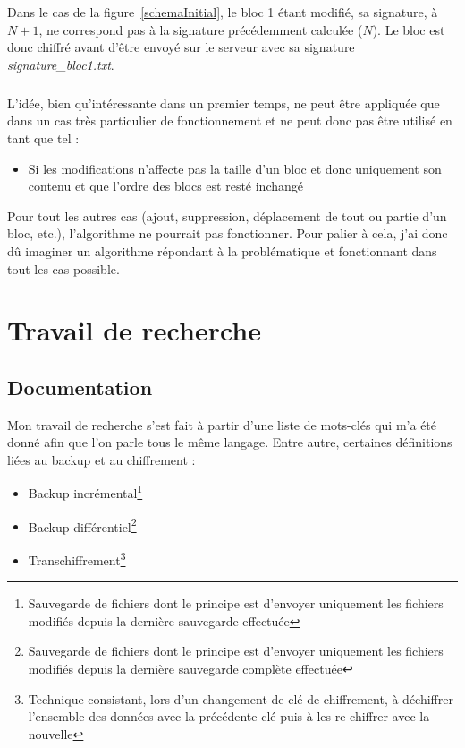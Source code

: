\documentclass[a4paper,10pt, twoside]{report}
\begin{document}
\begin{spacing}{1.2}
Dans le cas de la figure~\ref{schemaInitial}, le bloc 1 \'etant modifi\'e, sa
signature, \`a \(N + 1\), ne correspond pas \`a la signature pr\'ec\'edemment
calcul\'ee (\(N\)). Le bloc est donc chiffr\'e avant d'\^etre envoy\'e sur le
serveur avec sa signature \textit{signature\_bloc1.txt}.

\subparagraph{}
L'id\'ee, bien qu'int\'eressante dans un premier temps, ne peut \^etre
appliqu\'ee que dans un cas tr\`es particulier de fonctionnement et ne peut
donc pas \^etre utilis\'e en tant que tel :
\begin{itemize}
 \item Si les modifications n'affecte pas la taille d'un bloc et donc
 uniquement son contenu et que l'ordre des blocs est rest\'e inchang\'e
\end{itemize}

Pour tout les autres cas (ajout, suppression, d\'eplacement de tout ou partie
d'un bloc, etc.), l'algorithme ne pourrait pas fonctionner. Pour palier \`a
cela, j'ai donc d\^u imaginer un algorithme r\'epondant \`a la probl\'ematique
et fonctionnant dans tout les cas possible.

\section{Travail de recherche}
\label{secTravailRecherche}
\subsection{Documentation}
Mon travail de recherche s'est fait \`a partir d'une liste de mots-cl\'es qui
m'a \'et\'e donn\'e afin que l'on parle tous le m\^eme langage. Entre autre,
certaines d\'efinitions li\'ees au backup et au chiffrement :
\begin{itemize}
 \item Backup incr\'emental\footnote{Sauvegarde de fichiers dont le principe est
 d'envoyer uniquement les fichiers modifi\'es depuis la derni\`ere sauvegarde
 effectu\'ee}
 \item Backup diff\'erentiel\footnote{Sauvegarde de fichiers dont le principe
 est d'envoyer uniquement les fichiers modifi\'es depuis la derni\`ere
 sauvegarde compl\`ete effectu\'ee}
 \item Transchiffrement\footnote{Technique consistant, lors d'un changement
 de cl\'e de chiffrement, \`a d\'echiffrer l'ensemble des donn\'ees avec la
 pr\'ec\'edente cl\'e puis \`a les re-chiffrer avec la nouvelle}
\end{itemize}


\end{spacing}
\end{document}
